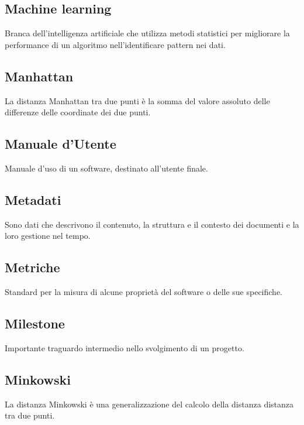 \documentclass[../glossario.tex]{subfiles}
\begin{document}
\subsection*{Machine learning}
{}
Branca dell'intelligenza artificiale che utilizza metodi statistici per migliorare la performance di un algoritmo nell'identificare pattern nei dati.


\subsection*{Manhattan} 
La distanza Manhattan tra due punti è la somma del valore assoluto delle differenze delle coordinate dei due punti.

\subsection*{Manuale d'Utente} 
Manuale d'uso di un software, destinato all'utente finale.

\subsection*{Metadati}
Sono dati che descrivono il contenuto, la struttura e il contesto dei documenti e la loro gestione nel tempo.


\subsection*{Metriche} 
Standard per la misura di alcune proprietà del software o delle sue specifiche.

\subsection*{Milestone} 
Importante traguardo intermedio nello svolgimento di un progetto.

\subsection*{Minkowski} 
La distanza Minkowski è una generalizzazione del calcolo della distanza distanza tra due punti.
\end{document}
